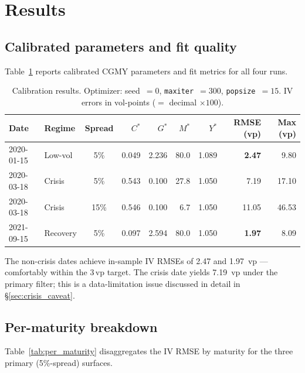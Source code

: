 \documentclass[11pt,a4paper]{article}
\begin{document}
\section{Results}
\label{sec:results}

\subsection{Calibrated parameters and fit quality}

Table~\ref{tab:main_results} reports calibrated CGMY parameters and fit
metrics for all four runs.

\begin{table}[ht]
\centering
\caption{Calibration results. Optimizer: seed~$=0$, \texttt{maxiter}~$=300$,
  \texttt{popsize}~$=15$.  IV errors in vol-points ($= $ decimal $\times 100$).}
\label{tab:main_results}
\setlength{\tabcolsep}{5pt}
\begin{tabular}{llcrrrr@{\hskip 8pt}rr}
\toprule
Date & Regime & Spread
  & $C^*$ & $G^*$ & $M^*$ & $Y^*$
  & RMSE (vp) & Max (vp) \\
\midrule
2020-01-15 & Low-vol  & 5\%
  & 0.049 & 2.236 & 80.0 & 1.089 & \textbf{2.47} & 9.80 \\
2020-03-18 & Crisis   & 5\%
  & 0.543 & 0.100 & 27.8 & 1.050 & 7.19 & 17.10 \\
2020-03-18 & Crisis   & 15\%
  & 0.546 & 0.100 &  6.7 & 1.050 & 11.05 & 46.53 \\
2021-09-15 & Recovery & 5\%
  & 0.097 & 2.594 & 80.0 & 1.050 & \textbf{1.97} & 8.09 \\
\bottomrule
\end{tabular}
\end{table}

The non-crisis dates achieve in-sample IV RMSEs of 2.47 and 1.97~vp —
comfortably within the 3\,vp target.
The crisis date yields 7.19~vp under the primary filter; this is a
data-limitation issue discussed in detail in \S\ref{sec:crisis_caveat}.

\subsection{Per-maturity breakdown}

Table~\ref{tab:per_maturity} disaggregates the IV RMSE by maturity
for the three primary (5\%-spread) surfaces.
\end{document}
